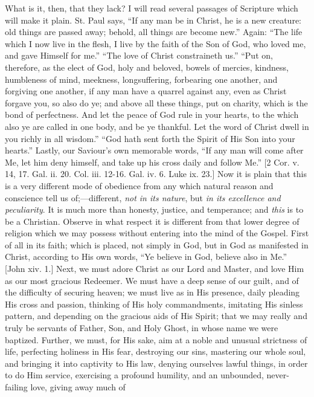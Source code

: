What is it, then, that they lack? I will read several
passages of Scripture which will make it plain. St. Paul
says, ``If any man be in Christ, he is a new
creature: old things are passed away; behold, all things
are become new.'' Again: ``The life which I now
live in the flesh, I live by the faith of the Son of God,
who loved me, and gave Himself for me.'' ``The
love of Christ constraineth us.'' ``Put on,
therefore, as the elect of God, holy and beloved, bowels
of mercies, kindness, humbleness of mind, meekness,
longsuffering, forbearing one another, and forgiving one
another, if any man have a quarrel against any, even as
Christ forgave you, so also do ye; and above all these
things, put on charity, which is the bond of perfectness.
And let the peace of God rule in your hearts, to the
which also ye are called in one body, and be ye thankful.
Let the word of Christ dwell in you richly in all
wisdom.'' ``God hath sent forth the Spirit of His
Son into your hearts.'' Lastly, our Saviour's own
memorable words, ``If any man will come after Me, let
him deny himself, and take up his cross daily and follow
Me.'' [2 Cor. v. 14, 17. Gal. ii. 20. Col. iii.
12-16. Gal. iv. 6. Luke ix. 23.] Now it is plain that
this is a very different mode of obedience from any which
natural reason and conscience tell us of;—different,
\emph{not in its nature}, but \emph{in its excellence and
peculiarity}. It is much more than honesty, justice,
and temperance; and \emph{this} is to be a Christian.
Observe in what respect it is different from that lower
degree of religion which we may possess without entering
into the mind of the Gospel. First of all in its faith;
which is placed, not simply in God, but in God as
manifested in Christ, according to His own words,
``Ye believe in God, believe also in Me.'' [John
xiv. 1.] Next, we must adore Christ as our Lord and
Master, and love Him as our most gracious Redeemer. We
must have a deep sense of our guilt, and of the
difficulty of securing heaven; we must live as in His
presence, daily pleading His cross and passion, thinking
of His holy commandments, imitating His sinless pattern,
and depending on the gracious aids of His Spirit; that we
may really and truly be servants of Father, Son, and Holy
Ghost, in whose name we were baptized. Further, we must,
for His sake, aim at a noble and unusual strictness of
life, perfecting holiness in His fear, destroying our sins, mastering our whole soul, and bringing it into
captivity to His law, denying ourselves lawful things, in
order to do Him service, exercising a profound humility,
and an unbounded, never-failing love, giving away much of
